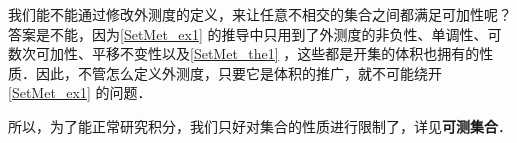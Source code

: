 我们能不能通过修改外测度的定义，来让任意不相交的集合之间都满足可加性呢？答案是不能，因为\autoref{SetMet_ex1} 的推导中只用到了外测度的非负性、单调性、可数次可加性、平移不变性以及\autoref{SetMet_the1} ，这些都是开集的体积也拥有的性质．因此，不管怎么定义外测度，只要它是体积的推广，就不可能绕开\autoref{SetMet_ex1} 的问题．

所以，为了能正常研究积分，我们只好对集合的性质进行限制了，详见\textbf{可测集合}．


















